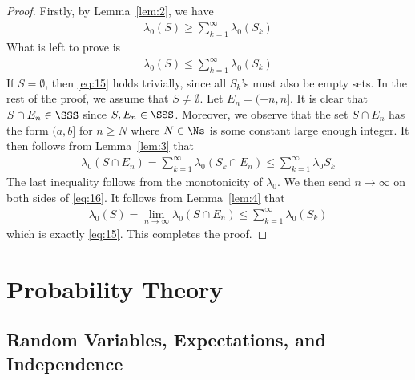 \documentclass[thmcnt=section, 12pt]{elegantbook}
\begin{document}
\begin{proof}
    Firstly, by Lemma~\ref{lem:2}, we have 
    \begin{align}
        \lambda_0(S) \geq \sum_{k=1}^\infty \lambda_0(S_k) 
        \label{eq:14}
    \end{align}
    What is left to prove is 
    \begin{align}
        \lambda_0(S) \leq \sum_{k=1}^\infty \lambda_0(S_k) 
        \label{eq:15}
    \end{align}
    If $S = \emptyset$, then \eqref{eq:15} holds trivially, since all $S_k$'s must also be empty sets. In the rest of the proof, we assume that $S \neq \emptyset$. Let $E_n = (-n, n]$. It is clear that $S \cap E_n \in \SSS$ since $S, E_n \in \SSS$. Moreover, we observe that the set $S \cap E_n$ has the form $(a, b]$ for $n \geq N$ where $N \in \Ns$ is some constant large enough integer. It then follows from Lemma~\ref{lem:3} that 
    \begin{align}
        \lambda_0(S \cap E_n)
        = \sum_{k=1}^\infty \lambda_0 (S_k \cap E_n)
        \leq \sum_{k=1}^\infty \lambda_0 S_k
        \label{eq:16}
    \end{align}
    The last inequality follows from the monotonicity of $\lambda_0$. We then send $n \to \infty$ on both sides of \eqref{eq:16}. It follows from Lemma~\ref{lem:4} that 
    \begin{align*}
        \lambda_0(S)
        = \lim_{n\to\infty} \lambda_0(S \cap E_n)
        \leq \sum_{k=1}^\infty \lambda_0(S_k)
    \end{align*}
    which is exactly \eqref{eq:15}. This completes the proof.
\end{proof}


\part{Probability Theory}





\chapter{Random Variables, Expectations, and Independence}

\end{document}
